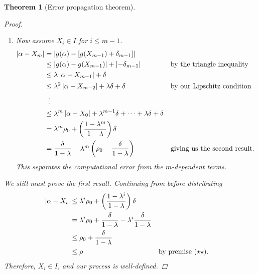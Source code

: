 \documentclass[12pt,letterpaper,DIV=11]{scrartcl}
\theoremstyle{plain}
\newtheorem{theorem}{Theorem}[section]
\theoremstyle{definition}
\theoremstyle{remark}
\begin{document}
\begin{theorem}[Error propagation theorem]
\begin{proof}
\begin{enumerate}
      \item Now assume $X_i \in I$ for $i \leq m - 1$.
        \begin{align*}
          \abs{\alpha - X_m} &= \abs{g(\alpha) - \left[ g(X_{m - 1}) + \delta_{m - 1} \right]} \\
                             &\leq \abs{g(\alpha) - g(X_{m - 1})} + \abs{-\delta_{m - 1}} && \text{by the triangle inequality} \\
                             &\leq \lambda \abs{\alpha - X_{m - 1}} + \delta \\
                             &\leq \lambda^2 \abs{\alpha - X_{m - 2}} + \lambda \delta  + \delta && \text{by our Lipschitz condition} \\
                             &\vdotswithin{\leq} \\
                             &\leq \lambda^m \abs{\alpha - X_0} + \lambda^{m - 1} \delta + \cdots + \lambda \delta + \delta \\
                             &= \lambda^m \rho_0 + \left( \frac{1 - \lambda^m}{1 - \lambda} \right) \delta \\
                             &= \frac{\delta}{1 - \lambda} - \lambda^m \left( \rho_0 - \frac{\delta}{1 - \lambda} \right) && \text{giving us the second result}.
        \end{align*}
        This separates the computational error from the $m$-dependent terms.
    \end{enumerate}
    We still must prove the first result.
    Continuing from before distributing \begin{align*}
      \left\lvert\alpha - X_i\right\rvert &\leq \lambda^i \rho_0 + \left( \frac{1 - \lambda^i}{1 - \lambda} \right) \delta \\
                         &= \lambda^i \rho_0 + \frac{\delta}{1 - \lambda} - \lambda^i \frac{\delta}{1 - \lambda} \\
                         &\leq \rho_0 + \frac{\delta}{1 - \lambda} \\
                         &\leq \rho && \text{by premise $(\star\star)$.}
    \end{align*}
    Therefore, $X_i \in I$, and our process is well-defined.
  \end{proof}
\end{theorem}
\end{document}
